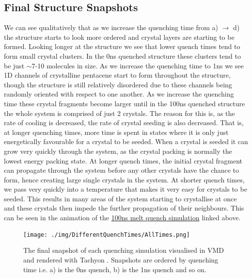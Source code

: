 \subsection{Final Structure Snapshots}
\noindent We can see qualitatively that as we increase the quenching time from a) $\rightarrow$ d) the structure starts to look more ordered and crystal layers are starting to be formed. Looking longer at the structure we see that lower quench times tend to form small crystal clusters. In the 0ns quenched structure these clusters tend to be just $\sim$7-10 molecules in size. As we increase the quenching time to 1ns we see 1D channels of crystalline pentacene start to form throughout the structure, though the structure is still relatively disordered due to these channels being randomly oriented with respect to one another. As we increase the quenching time these crystal fragments become larger until in the 100ns quenched structure the whole system is comprised of just 2 crystals. The reason for this is, as the rate of cooling is decreased, the rate of crystal seeding is also decreased. That is, at longer quenching times, more time is spent in states where it is only just energetically favourable for a crystal to be seeded. When a crystal is seeded it can grow very quickly through the system, as the crystal packing is normally the lowest energy packing state. At longer quench times, the initial crystal fragment can propagate through the system before any other crystals have the chance to form, hence creating large single crystals in the system. At shorter quench times, we pass very quickly into a temperature that makes it very easy for crystals to be seeded. This results in many areas of the system starting to crystallise at once and these crystals then impede the further propagation of their neighbours. This can be seen in the animation of the \href{https://youtu.be/6IQcYErQHVs}{100ns melt quench simulation} linked above.

\begin{figure}[ht]
	\texttt{[image: ./img/DifferentQuenchTimes/AllTimes.png]}
	\caption{\label{fig:final_snapshots}The final snapshot of each quenching simulation visualised in VMD \cite{VMD} and rendered with Tachyon \cite{Tachyon}. Snapshots are ordered by quenching time i.e. a) is the 0ns quench, b) is the 1ns quench and so on.}
\end{figure}
